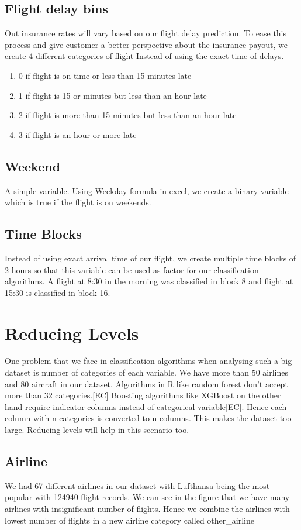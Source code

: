 \subsection{Flight delay bins}
Out insurance rates will vary based on our flight delay prediction. To ease this process and give customer a better perspective about the insurance payout, we create 4 different categories of flight Instead of using the exact time of delays. 
\begin{enumerate}
    \item 0 if flight is on time or less than 15 minutes late
    \item 1 if flight is 15 or minutes but less than an hour late
    \item 2 if flight is more than 15 minutes but less than an hour late
    \item 3 if flight is an hour or more late
\end{enumerate}

\subsection{Weekend}
A simple variable. Using Weekday formula in excel, we create a binary variable which is true if the flight is on weekends.

\subsection{Time Blocks}
Instead of using exact arrival time of our flight, we create multiple time blocks of 2 hours so that this variable can be used as factor for our classification algorithms. A flight at 8:30 in the morning was classified in block 8 and flight at 15:30 is classified in block 16.

\section{Reducing Levels}
One problem that we face in classification algorithms when analysing such a big dataset is number of categories of each variable. We have more than 50 airlines and 80 aircraft in our dataset. Algorithms in R like random forest don't accept more than 32 categories.[EC] Boosting algorithms like XGBoost on the other hand require indicator columns instead of categorical variable[EC]. Hence each column with n categories is converted to n columns. This makes the dataset too large. Reducing levels will help in this scenario too.

\subsection{Airline}
We had 67 different airlines in our dataset with Lufthansa being the most popular with 124940 flight records. We can see in the figure  that we have many airlines with insignificant number of flights. 
Hence we combine the airlines with lowest number of flights in a new airline category called other\_airline

